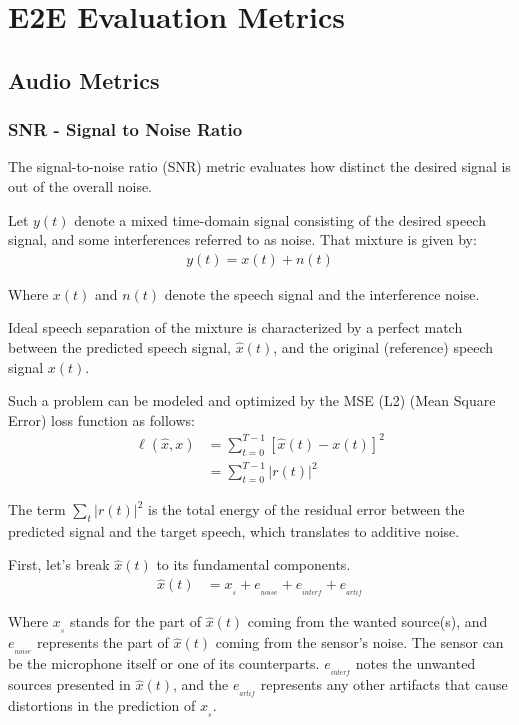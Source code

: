 \chapter{E2E Evaluation Metrics}\label{ch:metrics}
\section{Audio Metrics}
\subsection{SNR - Signal to Noise Ratio}
The signal-to-noise ratio (SNR) metric evaluates how
distinct the desired signal is out of the overall noise.

Let \(y(t)\) denote a mixed time-domain signal consisting of
the desired speech signal, and some interferences
referred to as noise.
That mixture is given by:
\begin{align}
    y(t) = x(t) + n(t)
\end{align}

Where \(x(t)\) and \(n(t)\) denote the speech signal and the
interference noise.

Ideal speech separation of the mixture is characterized by
a perfect match between the predicted speech signal, \(\widehat{x}(t)\), 
and the original (reference) speech signal \(x(t)\).

Such a problem can be modeled and optimized 
by the MSE (L2) (Mean Square Error) loss function as follows:
\begin{align}
    \ell(\widehat{x}, x) & = \sum_{t=0}^{T-1} \left[\widehat{x}(t) - x(t)\right]^{2} \\
    & = \sum_{t=0}^{T-1} |r(t)|^{2}
\end{align}

The term \(\sum_{t} |r(t)|^{2}\) 
is the total energy of the residual error between 
the predicted signal and the target speech,
which translates to additive noise.

First, let's break \(\widehat{x}(t)\) to its fundamental components\cite{1643671}.
\begin{align}
    \widehat{x}(t) & = x_{_{s}} + e_{_{noise}} + e_{_{interf}} + e_{_{artif}}
\end{align}

Where \(x_{_{s}}\) stands for the
part of \(\widehat{x}(t)\) coming from the 
wanted source(s), and \(e_{_{noise}}\) represents the part 
of \(\widehat{x}(t)\) coming from the sensor's noise. The sensor
can be the microphone itself or one of its counterparts.
\(e_{_{interf}}\) notes the unwanted sources presented
in \(\widehat{x}(t)\), and the \(e_{_{artif}}\)
represents any other artifacts that cause
distortions in the prediction of \(x_{_{s}}\).

